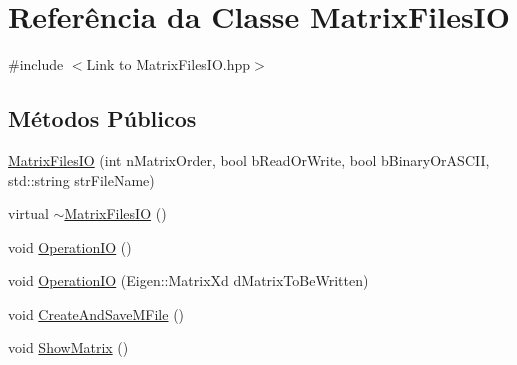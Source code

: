 \hypertarget{classMatrixFilesIO}{\section{Referência da Classe Matrix\-Files\-I\-O}
\label{classMatrixFilesIO}
}


{\ttfamily \#include $<$Link to Matrix\-Files\-I\-O.\-hpp$>$}

\subsection*{Métodos Públicos}
\begin{DoxyCompactItemize}
\item 
\hyperlink{classMatrixFilesIO_a2ee9e9a5f8069acaa387b6da8c1f9292}{Matrix\-Files\-I\-O} (int n\-Matrix\-Order, bool b\-Read\-Or\-Write, bool b\-Binary\-Or\-A\-S\-C\-I\-I, std\-::string str\-File\-Name)
\item 
virtual \hyperlink{classMatrixFilesIO_a7645a3e9f62d0392e0bf2fabfd01ac60}{$\sim$\-Matrix\-Files\-I\-O} ()
\item 
void \hyperlink{classMatrixFilesIO_ab03be51691b7df2dbd568c3a2c4712b2}{Operation\-I\-O} ()
\item 
void \hyperlink{classMatrixFilesIO_a480461ce9c342b163ab4e73204564f1c}{Operation\-I\-O} (Eigen\-::\-Matrix\-Xd d\-Matrix\-To\-Be\-Written)
\item 
void \hyperlink{classMatrixFilesIO_afbaf5a617dbce55f14f791bf27f2d053}{Create\-And\-Save\-M\-File} ()
\item 
void \hyperlink{classMatrixFilesIO_a9598951332c398ea59d7c18fc103e820}{Show\-Matrix} ()
\end{DoxyCompactItemize}


